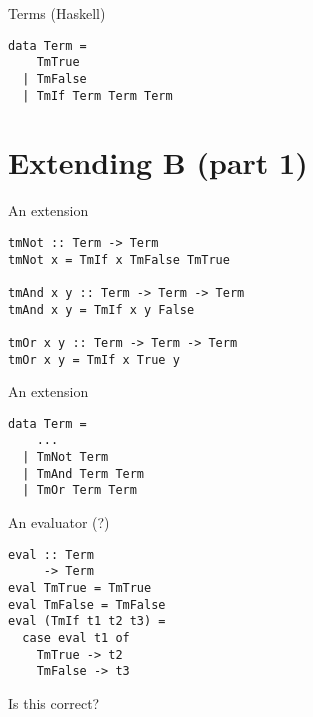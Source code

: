 \documentclass{beamer}
\begin{document}
\begin{frame}[fragile]
  \begin{center}
Terms (Haskell)
  \end{center}
  \begin{verbatim}
data Term =
    TmTrue
  | TmFalse
  | TmIf Term Term Term
  \end{verbatim}
\end{frame} 

\section{Extending B (part 1)}

\begin{frame}[fragile]
  \begin{center}
    An extension
  \end{center}
  \begin{verbatim}
tmNot :: Term -> Term
tmNot x = TmIf x TmFalse TmTrue

tmAnd x y :: Term -> Term -> Term
tmAnd x y = TmIf x y False

tmOr x y :: Term -> Term -> Term
tmOr x y = TmIf x True y
  \end{verbatim}
\end{frame} 

\begin{frame}[fragile]
  \begin{center}
    An extension
  \end{center}
  \begin{verbatim}
data Term =
    ...
  | TmNot Term
  | TmAnd Term Term
  | TmOr Term Term
  \end{verbatim}
\end{frame} 

\begin{frame}[fragile]
  \begin{center}
An evaluator (?)
  \end{center}
  \begin{verbatim}
eval :: Term 
     -> Term
eval TmTrue = TmTrue
eval TmFalse = TmFalse
eval (TmIf t1 t2 t3) =
  case eval t1 of
    TmTrue -> t2
    TmFalse -> t3
  \end{verbatim}
\end{frame} 

\begin{frame}[c]
  \begin{center}
Is this correct?
  \end{center}
\end{frame}
\end{document}
